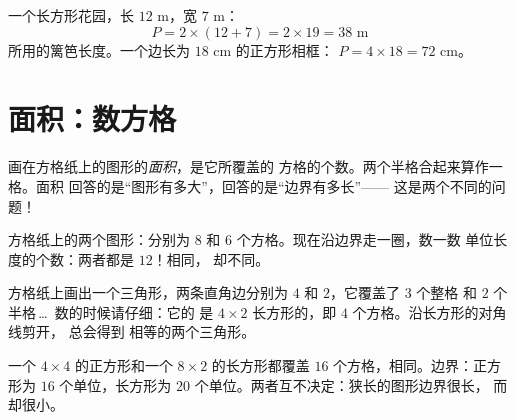 \begin{example}\label{ex:g4:measure:perimeter}
一个长方形花园，长 $12$ m，宽 $7$ m：
\[
P = 2 \times (12 + 7) = 2 \times 19 = 38 \text{ m}
\]
所用的篱笆长度。一个边长为 $18$ cm 的正方形相框：
$P = 4 \times 18 = 72$ cm。
\end{example}

\section{面积：数方格}

\begin{definition}[数方格求面积]\label{def:g4:measure:area}
画在方格纸上的图形的\emph{面积}，是它所覆盖的
方格的个数。两个半格合起来算作一格。面积
回答的是“图形有多大”，回答的是“边界有多长”——
这是两个不同的问题！
\end{definition}

\begin{omfigure}

{\small 方格纸上的两个图形：分别为 $8$ 和 $6$ 个方格。现在沿边界走一圈，数一数
单位长度的个数：两者都是 $12$！相同，
却不同。}
\end{omfigure}

\begin{example}[半格]\label{ex:g4:measure:half}
方格纸上画出一个三角形，两条直角边分别为 $4$ 和 $2$，它覆盖了 $3$ 个整格
和 $2$ 个半格\,\dots\ 数的时候请仔细：它的
是 $4 \times 2$ 长方形的，即 $4$ 个方格。沿长方形的对角线剪开，
总会得到
相等的两个三角形。
\end{example}

\begin{example}\label{ex:g4:measure:samearea}
一个 $4 \times 4$ 的正方形和一个 $8 \times 2$ 的长方形都覆盖 $16$
个方格，相同。边界：正方形为 $16$ 个单位，长方形为 $20$
个单位。两者互不决定：狭长的图形边界很长，
而却很小。
\end{example}

